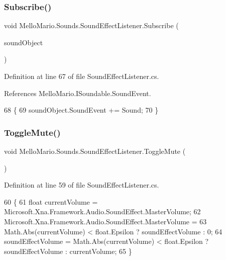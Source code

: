 \mbox{\label{classMelloMario_1_1Sounds_1_1SoundEffectListener_a0c1e383d7b2263221047f7ac7da511dc}} 
\subsubsection{Subscribe()\hspace{0.1cm}{\footnotesize\ttfamily [2/2]}}
{\footnotesize\ttfamily void Mello\+Mario.\+Sounds.\+Sound\+Effect\+Listener.\+Subscribe (\begin{DoxyParamCaption}\item[{\textbf{ I\+Soundable}}]{sound\+Object }\end{DoxyParamCaption})}



Definition at line 67 of file Sound\+Effect\+Listener.\+cs.



References Mello\+Mario.\+I\+Soundable.\+Sound\+Event.


\begin{DoxyCode}
68         \{
69             soundObject.SoundEvent += Sound;
70         \}
\end{DoxyCode}
\mbox{\label{classMelloMario_1_1Sounds_1_1SoundEffectListener_a59a1fc2a935aba4320cfb69186dc05fb}} 
\subsubsection{Toggle\+Mute()}
{\footnotesize\ttfamily void Mello\+Mario.\+Sounds.\+Sound\+Effect\+Listener.\+Toggle\+Mute (\begin{DoxyParamCaption}{ }\end{DoxyParamCaption})}



Definition at line 59 of file Sound\+Effect\+Listener.\+cs.


\begin{DoxyCode}
60         \{
61             \textcolor{keywordtype}{float} currentVolume = Microsoft.Xna.Framework.Audio.SoundEffect.MasterVolume;
62             Microsoft.Xna.Framework.Audio.SoundEffect.MasterVolume =
63                 Math.Abs(currentVolume) < \textcolor{keywordtype}{float}.Epsilon ? soundEffectVolume : 0;
64             soundEffectVolume = Math.Abs(currentVolume) < \textcolor{keywordtype}{float}.Epsilon ? 
      soundEffectVolume : currentVolume;
65         \}
\end{DoxyCode}


